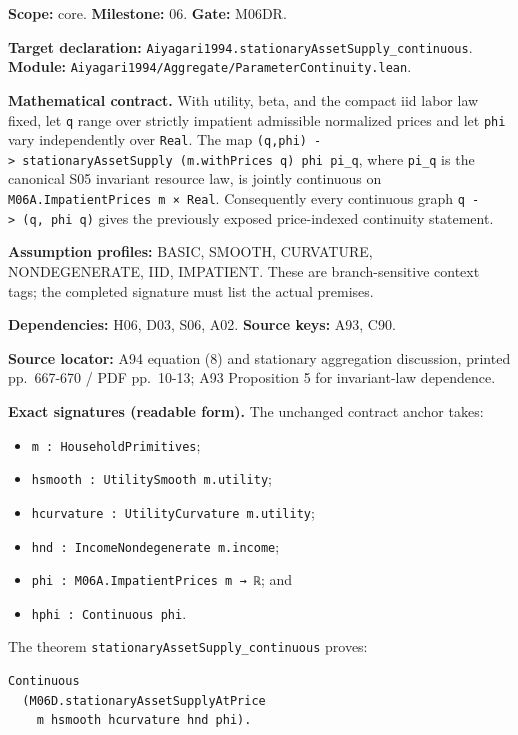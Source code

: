 \documentclass[
  11pt,
]{article}
\providecommand{\tightlist}{%
  \setlength{\itemsep}{0pt}\setlength{\parskip}{0pt}}
\let\LedgerOriginalTexttt\texttt
\renewcommand{\texttt}[1]{{\small\LedgerOriginalTexttt{#1}}}
\begin{document}
\textbf{Scope:} core. \textbf{Milestone:} 06. \textbf{Gate:} M06DR.

\textbf{Target declaration:}
\texttt{Aiyagari1994.stationaryAssetSupply\_continuous}.\\
\textbf{Module:}
\texttt{Aiyagari1994/Aggregate/ParameterContinuity.lean}.

\textbf{Mathematical contract.} With utility, beta, and the compact iid
labor law fixed, let \texttt{q} range over strictly impatient admissible
normalized prices and let \texttt{phi} vary independently over
\texttt{Real}. The map
\texttt{(q,phi)\ \textbar{}-\textgreater{}\ stationaryAssetSupply\ (m.withPrices\ q)\ phi\ pi\_q},
where \texttt{pi\_q} is the canonical S05 invariant resource law, is
jointly continuous on \texttt{M06A.ImpatientPrices\ m\ ×\ Real}.
Consequently every continuous graph
\texttt{q\ \textbar{}-\textgreater{}\ (q,\ phi\ q)} gives the previously
exposed price-indexed continuity statement.

\textbf{Assumption profiles:} BASIC, SMOOTH, CURVATURE, NONDEGENERATE,
IID, IMPATIENT. These are branch-sensitive context tags; the completed
signature must list the actual premises.

\textbf{Dependencies:} H06, D03, S06, A02. \textbf{Source keys:} A93,
C90.

\textbf{Source locator:} A94 equation (8) and stationary aggregation
discussion, printed pp.~667-670 / PDF pp.~10-13; A93 Proposition 5 for
invariant-law dependence.

\textbf{Exact signatures (readable form).} The unchanged contract anchor
takes:

\begin{itemize}
\tightlist
\item
  \texttt{m\ :\ HouseholdPrimitives};
\item
  \texttt{hsmooth\ :\ UtilitySmooth\ m.utility};
\item
  \texttt{hcurvature\ :\ UtilityCurvature\ m.utility};
\item
  \texttt{hnd\ :\ IncomeNondegenerate\ m.income};
\item
  \texttt{phi\ :\ M06A.ImpatientPrices\ m\ →\ ℝ}; and
\item
  \texttt{hphi\ :\ Continuous\ phi}.
\end{itemize}

The theorem \texttt{stationaryAssetSupply\_continuous} proves:

\begin{verbatim}
Continuous
  (M06D.stationaryAssetSupplyAtPrice
    m hsmooth hcurvature hnd phi).
\end{verbatim}
\end{document}
